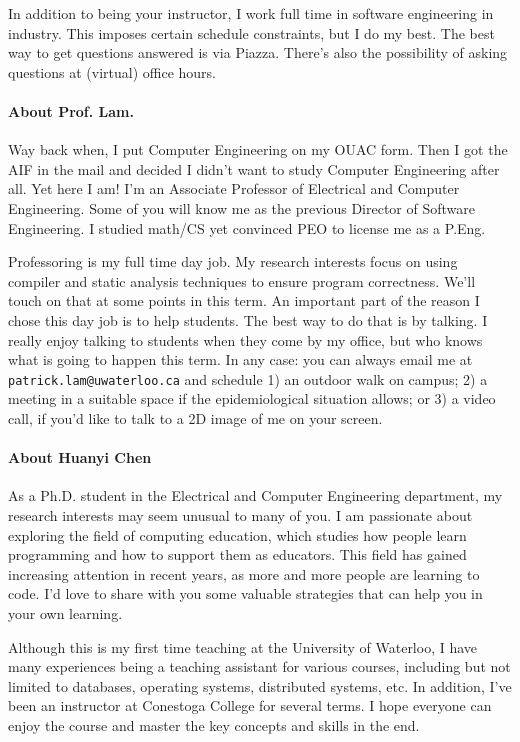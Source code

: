 In addition to being your instructor, I work full time in software engineering in industry. This imposes certain schedule constraints, but I do my best. The best way to get questions answered is via Piazza. There's also the possibility of asking questions at (virtual) office hours.

\paragraph{About Prof. Lam.}
Way back when, I put Computer Engineering on my OUAC form. Then I got the AIF in the mail and decided I didn't want to study Computer Engineering after all. Yet here I am! I'm an Associate Professor of Electrical and Computer Engineering. Some of you will know me as the previous Director of Software Engineering. I studied math/CS yet convinced PEO to license me as a P.Eng.

Professoring is my full time day job. My research interests focus on using compiler and static analysis techniques to ensure program correctness. We'll touch on that at some points in this term. An important part of the reason I chose this day job is to help students. The best way to do that is by talking. I really enjoy talking to students when they come by my office, but who knows what is going to happen this term. In any case: you can always email me at {\tt patrick.lam@uwaterloo.ca} and schedule 1) an outdoor walk on campus; 2) a meeting in a suitable space if the epidemiological situation allows; or 3) a video call, if you'd like to talk to a 2D image of me on your screen.

\paragraph{About Huanyi Chen}
As a Ph.D. student in the Electrical and Computer Engineering department, my research interests may seem unusual to many of you. I am passionate about exploring the field of computing education, which studies how people learn programming and how to support them as educators. This field has gained increasing attention in recent years, as more and more people are learning to code. I'd love to share with you some valuable strategies that can help you in your own learning.

Although this is my first time teaching at the University of Waterloo, I have many experiences being a teaching assistant for various courses, including but not limited to databases, operating systems, distributed systems, etc. In addition, I've been an instructor at Conestoga College for several terms. I hope everyone can enjoy the course and master the key concepts and skills in the end.

